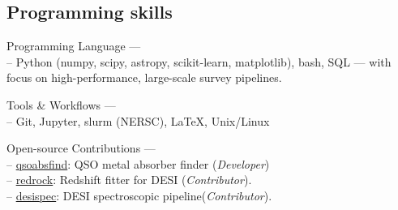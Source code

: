 \documentclass[12pt,letterpaper]{article}
\begin{document}
\subsection{Programming skills}
\begin{list}{}{\cvlist}
\item Programming Language ---\\
   -- Python (numpy, scipy, astropy, scikit-learn, matplotlib), bash, SQL — with focus on high-performance, large-scale survey pipelines.
  \item Tools \& Workflows ---\\
  -- Git, Jupyter, slurm (NERSC), LaTeX, Unix/Linux
\item Open-source Contributions ---\\
   -- \href{https://github.com/abhi0395/qsoabsfind}{qsoabsfind}: QSO metal absorber finder (\textit{Developer})\\
   -- \href{https://github.com/desihub/redrock}{redrock}: Redshift fitter for DESI (\textit{Contributor}).\\
   -- \href{https://github.com/desihub/desispec}{desispec}: DESI spectroscopic pipeline(\textit{Contributor}).
\end{list}


\end{document}
